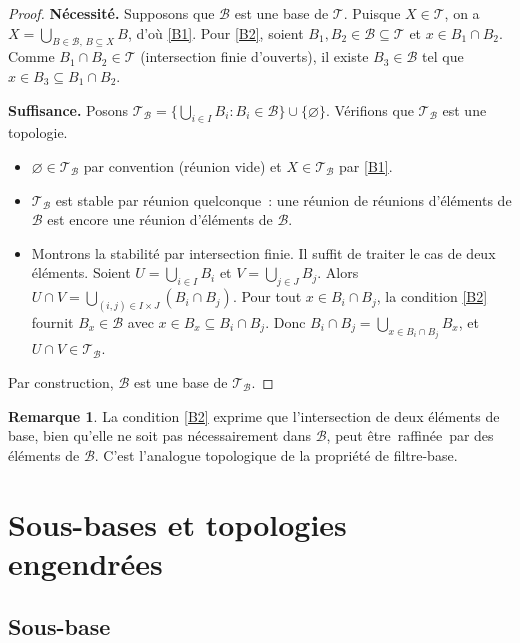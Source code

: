 \documentclass[12pt,a4paper,openany]{book}
\theoremstyle{definition}
\theoremstyle{cours}
\theoremstyle{coursnormal}
\newtheorem{remarque}[theoreme]{Remarque}
\newcommand{\T}{\mathcal{T}}
\newcommand{\B}{\mathcal{B}}
\providecommand{\og}{\guillemotleft\,}
\providecommand{\fg}{\,\guillemotright}
\begin{document}
\begin{proof}
  \textbf{Nécessité.} Supposons que $\B$ est une base de $\T$. Puisque
  $X\in\T$, on a $X=\bigcup_{B\in\B,\, B\subseteq X} B$, d'où \ref{B1}. Pour
  \ref{B2}, soient $B_1,B_2\in\B\subseteq\T$ et $x\in B_1\cap B_2$. Comme
  $B_1\cap B_2\in\T$ (intersection finie d'ouverts), il existe $B_3\in\B$ tel
  que $x\in B_3\subseteq B_1\cap B_2$.

  \textbf{Suffisance.} Posons
  $\T_{\B}=\bigl\{\bigcup_{i\in I} B_i : B_i\in\B\bigr\}\cup\{\varnothing\}$.
  Vérifions que $\T_{\B}$ est une topologie.
  \begin{itemize}
    \item $\varnothing\in\T_{\B}$ par convention (réunion vide) et
      $X\in\T_{\B}$ par \ref{B1}.
    \item $\T_{\B}$ est stable par réunion quelconque~: une réunion de réunions
      d'éléments de $\B$ est encore une réunion d'éléments de $\B$.
    \item Montrons la stabilité par intersection finie. Il suffit de traiter le
      cas de deux éléments. Soient
      $U=\bigcup_{i\in I} B_i$ et $V=\bigcup_{j\in J} B_j$. Alors
      $U\cap V = \bigcup_{(i,j)\in I\times J} (B_i\cap B_j)$. Pour tout
      $x\in B_i\cap B_j$, la condition \ref{B2} fournit $B_x\in\B$ avec
      $x\in B_x\subseteq B_i\cap B_j$. Donc
      $B_i\cap B_j = \bigcup_{x\in B_i\cap B_j} B_x$, et
      $U\cap V\in\T_{\B}$.
  \end{itemize}
  Par construction, $\B$ est une base de $\T_{\B}$.
\end{proof}

\begin{remarque}
  La condition \ref{B2} exprime que l'intersection de deux éléments de base,
  bien qu'elle ne soit pas nécessairement dans $\B$, peut être \og{}raffinée\fg{}
  par des éléments de $\B$. C'est l'analogue topologique de la propriété de
  filtre-base.
\end{remarque}

\section{Sous-bases et topologies engendrées}\label{sec:sousbases}

\subsection{Sous-base}\label{subsec:sousbase-def}
\end{document}
